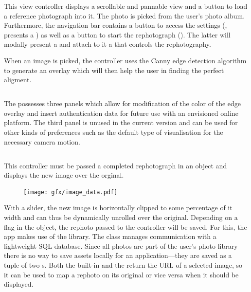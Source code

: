 This view controller displays a scrollable and pannable view and a button
 to load a reference photograph into it. The
photo is picked from the user's photo album.  Furthermore, the navigation bar
contains a button to access the settings
(, presents a
) as well as a button to start the rephotograph
(). The latter
will modally present a  and attach to it a
 that controls the rephotography.

When an image is picked, the controller uses the Canny edge detection algorithm
\citep{canny1986} to generate an overlay which will then help the user in
finding the perfect aligment.

\subsection*{}

The  possesses three panels which allow for
modification of the color of the edge overlay and insert authentication data for
future use with an envisioned online platform. The third panel is unused in the current
version and can be used for other kinds of preferences such as the default type
of visualisation for the necessary camera motion.

\subsection*{}

This controller must be passed a completed rephotograph in an 
object and displays the new image over the orginal. 
\begin{figure}
   \texttt{[image: gfx/image\_data.pdf]}
\end{figure}
With a slider, the new image
is horizontally clipped to some percentage of it width and can thus be
dynamically unrolled over the original. Depending on a flag in the
 object, the rephoto passed to the controller will be saved. For
this, the app makes use of the  library. The  class
manages communication with a lightweight SQL database. Since all photos are
part of the user's photo library---there is no way to save assets locally for an
application---they are saved as a tuple of two s. Both the built-in
 and the  return
the URL of a selected image, so it can be used to map a rephoto on its original
or vice versa when it should be displayed.

